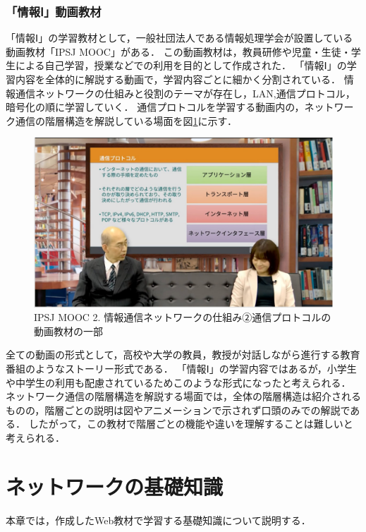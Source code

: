 \documentclass[12pt,a4j,titlepage]{ltjsarticle}
\begin{document}
\clearpage

\subsubsection{「情報Ⅰ」動画教材}
「情報Ⅰ」の学習教材として，一般社団法人である情報処理学会が設置している動画教材「IPSJ MOOC」がある\cite{koukou_douga1}．
この動画教材は，教員研修や児童・生徒・学生による自己学習，授業などでの利用を目的として作成された．
「情報Ⅰ」の学習内容を全体的に解説する動画で，学習内容ごとに細かく分割されている．
情報通信ネットワークの仕組みと役割のテーマが存在し，LAN,通信プロトコル，暗号化の順に学習していく．
通信プロトコルを学習する動画内の，ネットワーク通信の階層構造を解説している場面を図\ref{fig:kou_douga}に示す\cite{koukou_douga2}．

\begin{figure}[h]
\centering
\includegraphics[clip,width=150mm]{figures/koudouga.pdf}
\caption[IPSJ MOOC2. 情報通信ネットワークの仕組み②通信プロトコルの動画教材]{IPSJ MOOC 2. 情報通信ネットワークの仕組み②通信プロトコルの動画教材の一部\linebreak}
\label{fig:kou_douga}
\end{figure}

全ての動画の形式として，高校や大学の教員，教授が対話しながら進行する教育番組のようなストーリー形式である．
「情報Ⅰ」の学習内容ではあるが，小学生や中学生の利用も配慮されているためこのような形式になったと考えられる．
ネットワーク通信の階層構造を解説する場面では，全体の階層構造は紹介されるものの，階層ごとの説明は図やアニメーションで示されず口頭のみでの解説である．
したがって，この教材で階層ごとの機能や違いを理解することは難しいと考えられる．
\clearpage

\section{ネットワークの基礎知識}%
本章では，作成したWeb教材で学習する基礎知識について説明する．
\end{document}
